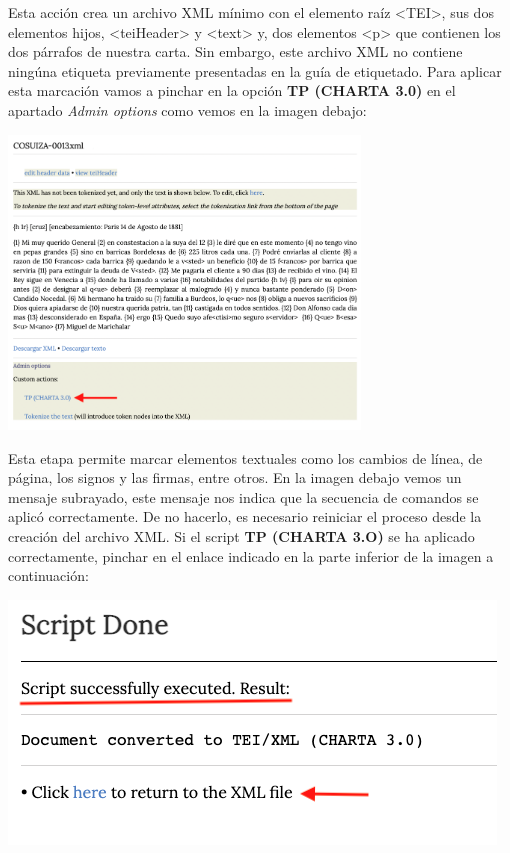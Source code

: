 \documentclass[
]{book}
\begin{document}
Esta acción crea un archivo XML mínimo con el elemento raíz {\textless TEI\textgreater{}}, sus dos elementos hijos, { \textless teiHeader\textgreater{}} y {\textless text\textgreater{}} y, dos elementos { \textless p\textgreater{}} que contienen los dos párrafos de nuestra carta. Sin embargo, este archivo XML no contiene ningúna etiqueta previamente presentadas en la guía de etiquetado. Para aplicar esta marcación vamos a pinchar en la opción \textbf{TP (CHARTA 3.0)} en el apartado \emph{Admin options} como vemos en la imagen debajo:

\includegraphics[width=0.7\textwidth,height=\textheight]{img/scriptCHtoTeitok.png}

Esta etapa permite marcar elementos textuales como los cambios de línea, de página, los signos y las firmas, entre otros. En la imagen debajo vemos un mensaje subrayado, este mensaje nos indica que la secuencia de comandos se aplicó correctamente. De no hacerlo, es necesario reiniciar el proceso desde la creación del archivo XML. Si el script \textbf{TP (CHARTA 3.O)} se ha aplicado correctamente, pinchar en el enlace indicado en la parte inferior de la imagen a continuación:

\includegraphics{img/scriptdone.png}
\end{document}
